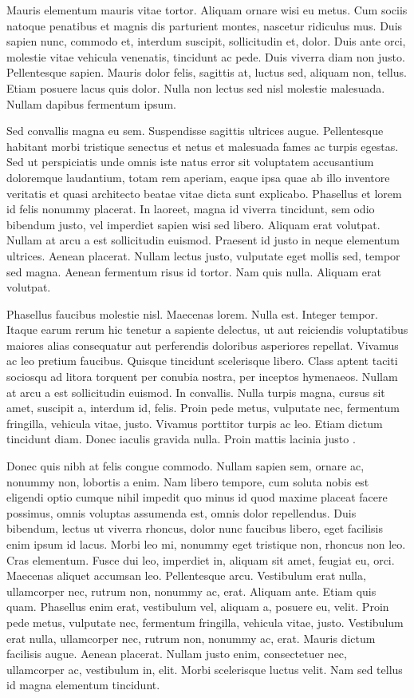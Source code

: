 Mauris elementum mauris vitae tortor. Aliquam ornare wisi eu metus. Cum sociis natoque penatibus et magnis dis parturient montes, nascetur ridiculus mus. Duis sapien nunc, commodo et, interdum suscipit, sollicitudin et, dolor. Duis ante orci, molestie vitae vehicula venenatis, tincidunt ac pede. Duis viverra diam non justo. Pellentesque sapien. Mauris dolor felis, sagittis at, luctus sed, aliquam non, tellus. Etiam posuere lacus quis dolor. Nulla non lectus sed nisl molestie malesuada. Nullam dapibus fermentum ipsum.

Sed convallis magna eu sem. Suspendisse sagittis ultrices augue. Pellentesque habitant morbi tristique senectus et netus et malesuada fames ac turpis egestas. Sed ut perspiciatis unde omnis iste natus error sit voluptatem accusantium doloremque laudantium, totam rem aperiam, eaque ipsa quae ab illo inventore veritatis et quasi architecto beatae vitae dicta sunt explicabo. Phasellus et lorem id felis nonummy placerat. In laoreet, magna id viverra tincidunt, sem odio bibendum justo, vel imperdiet sapien wisi sed libero. Aliquam erat volutpat. Nullam at arcu a est sollicitudin euismod. Praesent id justo in neque elementum ultrices. Aenean placerat. Nullam lectus justo, vulputate eget mollis sed, tempor sed magna. Aenean fermentum risus id tortor. Nam quis nulla. Aliquam erat volutpat.

Phasellus faucibus molestie nisl. Maecenas lorem. Nulla est. Integer tempor. Itaque earum rerum hic tenetur a sapiente delectus, ut aut reiciendis voluptatibus maiores alias consequatur aut perferendis doloribus asperiores repellat. Vivamus ac leo pretium faucibus. Quisque tincidunt scelerisque libero. Class aptent taciti sociosqu ad litora torquent per conubia nostra, per inceptos hymenaeos. Nullam at arcu a est sollicitudin euismod. In convallis. Nulla turpis magna, cursus sit amet, suscipit a, interdum id, felis. Proin pede metus, vulputate nec, fermentum fringilla, vehicula vitae, justo. Vivamus porttitor turpis ac leo. Etiam dictum tincidunt diam. Donec iaculis gravida nulla. Proin mattis lacinia justo \cite{grisetti2010tutorial}.

Donec quis nibh at felis congue commodo. Nullam sapien sem, ornare ac, nonummy non, lobortis a enim. Nam libero tempore, cum soluta nobis est eligendi optio cumque nihil impedit quo minus id quod maxime placeat facere possimus, omnis voluptas assumenda est, omnis dolor repellendus. Duis bibendum, lectus ut viverra rhoncus, dolor nunc faucibus libero, eget facilisis enim ipsum id lacus. Morbi leo mi, nonummy eget tristique non, rhoncus non leo. Cras elementum. Fusce dui leo, imperdiet in, aliquam sit amet, feugiat eu, orci. Maecenas aliquet accumsan leo. Pellentesque arcu. Vestibulum erat nulla, ullamcorper nec, rutrum non, nonummy ac, erat. Aliquam ante. Etiam quis quam. Phasellus enim erat, vestibulum vel, aliquam a, posuere eu, velit. Proin pede metus, vulputate nec, fermentum fringilla, vehicula vitae, justo. Vestibulum erat nulla, ullamcorper nec, rutrum non, nonummy ac, erat. Mauris dictum facilisis augue. Aenean placerat. Nullam justo enim, consectetuer nec, ullamcorper ac, vestibulum in, elit. Morbi scelerisque luctus velit. Nam sed tellus id magna elementum tincidunt.

